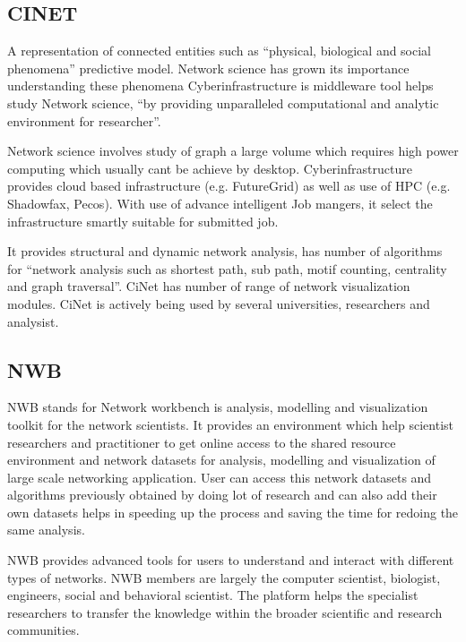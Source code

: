 \subsection{CINET}

    A representation of connected entities such as ``physical,
    biological and social phenomena'' \cite{www-bi-vt-edu} predictive
    model. Network science has grown its importance understanding
    these phenomena Cyberinfrastructure is middleware tool helps study
    Network science, \cite{www-portal-futuresystems-org-projects-233}
    ``by providing unparalleled computational and analytic environment
    for researcher''.
 
    Network science involves study of graph a large volume which
    requires high power computing which usually cant be achieve by
    desktop. Cyberinfrastructure provides cloud based infrastructure
    (e.g. FutureGrid) as well as use of HPC (e.g. Shadowfax,
    Pecos). With use of advance intelligent Job mangers, it select the
    infrastructure smartly suitable for submitted job.
     
    It provides structural and dynamic network analysis, has number of
    algorithms for ``network analysis such as shortest path, sub path,
    motif counting, centrality and graph traversal''. CiNet has number
    of range of network visualization modules.  CiNet is actively
    being used by several universities, researchers and analysist.

\subsection{NWB}

    \cite{www-nwb.edu} NWB stands for Network workbench is analysis,
    modelling and visualization toolkit for the network scientists.
    It provides an environment which help scientist researchers and
    practitioner to get online access to the shared resource
    environment and network datasets for analysis, modelling and
    visualization of large scale networking application.  User can
    access this network datasets and algorithms previously obtained by
    doing lot of research and can also add their own datasets helps in
    speeding up the process and saving the time for redoing the same
    analysis.

    NWB provides advanced tools for users to understand and interact
    with different types of networks.  NWB members are largely the
    computer scientist, biologist, engineers, social and behavioral
    scientist. The platform helps the specialist researchers to
    transfer the knowledge within the broader scientific and research
    communities.
	
